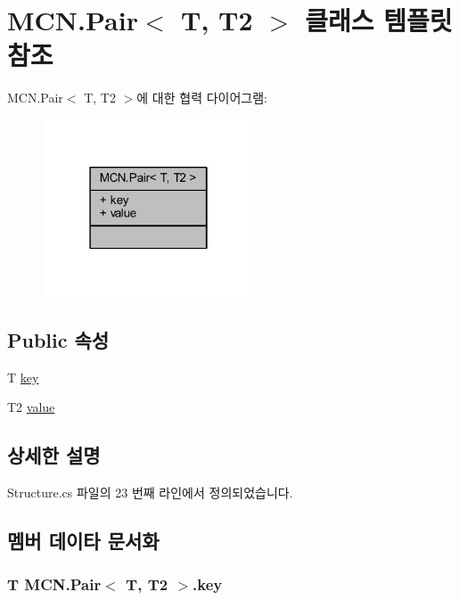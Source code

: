 \hypertarget{class_m_c_n_1_1_pair}{}\section{M\+C\+N.\+Pair$<$ T, T2 $>$ 클래스 템플릿 참조}
\label{class_m_c_n_1_1_pair}


M\+C\+N.\+Pair$<$ T, T2 $>$에 대한 협력 다이어그램\+:\nopagebreak
\begin{figure}[H]
\begin{center}
\leavevmode
\includegraphics[width=178pt]{class_m_c_n_1_1_pair__coll__graph}
\end{center}
\end{figure}
\subsection*{Public 속성}
\begin{DoxyCompactItemize}
\item 
T \hyperlink{class_m_c_n_1_1_pair_a62c546d3829b8819a65f8c9d64200338}{key}
\item 
T2 \hyperlink{class_m_c_n_1_1_pair_a1980bbf37b60fcbfea22382f71250e84}{value}
\end{DoxyCompactItemize}


\subsection{상세한 설명}


Structure.\+cs 파일의 23 번째 라인에서 정의되었습니다.



\subsection{멤버 데이타 문서화}
\subsubsection[{\texorpdfstring{key}{key}}]{\setlength{\rightskip}{0pt plus 5cm}T {\bf M\+C\+N.\+Pair}$<$ T, T2 $>$.key}\hypertarget{class_m_c_n_1_1_pair_a62c546d3829b8819a65f8c9d64200338}{}\label{class_m_c_n_1_1_pair_a62c546d3829b8819a65f8c9d64200338}


